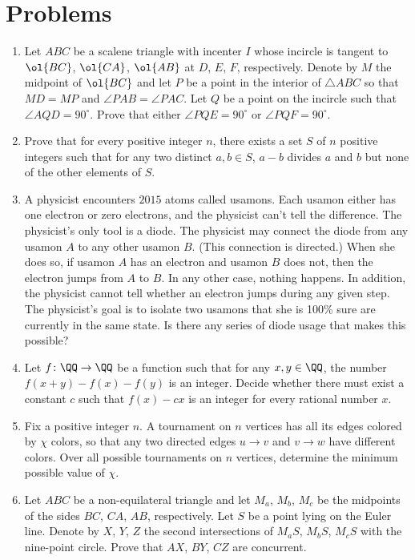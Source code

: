 \documentclass[11pt]{scrartcl}
\begin{document}
\section{Problems}
\begin{enumerate}[\bfseries 1.]
\item %
Let $ABC$ be a scalene triangle with incenter $I$ whose incircle is
tangent to $\ol{BC}$, $\ol{CA}$, $\ol{AB}$ at $D$, $E$, $F$,
respectively.  Denote by $M$ the midpoint of $\ol{BC}$ and
let $P$ be a point in the interior of $\triangle ABC$
so that $MD = MP$ and $\angle PAB = \angle PAC$.
Let $Q$ be a point on the incircle such that $\angle AQD = 90^{\circ}$.
Prove that either $\angle PQE = 90^{\circ}$ or $\angle PQF = 90^{\circ}$.

\item %
Prove that for every positive integer $n$, there exists a set $S$ of $n$ positive integers
such that for any two distinct $a,b \in S$, $a-b$ divides $a$ and $b$
but none of the other elements of $S$.

\item %
A physicist encounters $2015$ atoms called usamons.
Each usamon either has one electron or zero electrons,
and the physicist can't tell the difference.
The physicist's only tool is a diode.
The physicist may connect the diode from any usamon $A$
to any other usamon $B$.  (This connection is directed.)
When she does so, if usamon $A$ has an electron and usamon $B$
does not, then the electron jumps from $A$ to $B$.
In any other case, nothing happens.  In addition,
the physicist cannot tell whether an electron jumps during any given step.
The physicist's goal is to isolate two usamons that she is 100\%
sure are currently in the same state.
Is there any series of diode usage that makes this possible?

\item %
Let $f \colon \QQ \to \QQ$ be a function such that for any $x,y \in \QQ$,
the number $f(x+y)-f(x)-f(y)$ is an integer.
Decide whether there must exist a constant $c$
such that $f(x) - cx$ is an integer for every rational number $x$.

\item %
Fix a positive integer $n$.
A tournament on $n$ vertices has all its edges colored by $\chi$ colors,
so that any two directed edges $u \to v$
and $v \to w$ have different colors.
Over all possible tournaments on $n$ vertices,
determine the minimum possible value of $\chi$.

\item %
Let $ABC$ be a non-equilateral triangle
and let $M_a$, $M_b$, $M_c$ be the midpoints
of the sides $BC$, $CA$, $AB$, respectively.
Let $S$ be a point lying on the Euler line.
Denote by $X$, $Y$, $Z$ the second intersections
of $M_a S$, $M_b S$, $M_c S$ with the nine-point circle.
Prove that $AX$, $BY$, $CZ$ are concurrent.

\end{enumerate}
\pagebreak
\end{document}

